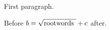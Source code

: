 \documentclass{article}
\begin{document}
First paragraph.

Before $b = \sqrt{\hbox{root\par words \lxmbf}} + c$ after.
\end{document}
